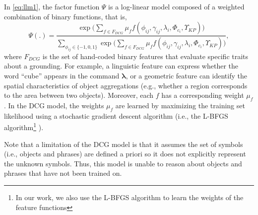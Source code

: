 In \eqref{eq:llm1}, the factor function $\Psi$ is a log-linear model composed of a weighted combination of binary functions, that is,
\begin{equation}
\Psi(.) = \frac {\exp \Big( \sum\limits_{f \in F_{DCG}} \mu_f f(\phi_{ij},\gamma_{ij},\lambda_i,\Phi_{c_{i}},\Upsilon_{KP}) \Big)}{\sum\limits_{\phi_{ij} \in \{-1,0,1\}}\exp \Big( \sum\limits_{f \in F_{DCG}} \mu_f f(\phi_{ij},\gamma_{ij},\lambda_i,\Phi_{c_{i}},\Upsilon_{KP}) \Big)},
\label{eq:llm2}
\end{equation}
where $F_{DCG}$ is the set of hand-coded binary features that evaluate specific traits about a grounding. For example, a linguistic feature can express whether the word ``cube'' appears in the command $\boldsymbol{\lambda}$, or a geometric feature can identify the spatial characteristics of object aggregations (e.g., whether a region corresponds to the area between two objects). Moreover, each $f$ has a corresponding weight $\mu_f$. In the DCG model, the weights $\mu_f$ are learned by maximizing the training set likelihood using a stochastic gradient descent algorithm (i.e., the L-BFGS algorithm\footnote{In our work, we also use the {L-BFGS} algorithm to learn the weights of the feature functions} \cite{liu1989}). 


Note that a limitation of the DCG model is that it assumes the set of symbols (i.e., objects and phrases) are defined a priori so it does not explicitly represent the unknown symbols. Thus, this model is unable to reason about objects and phrases that have not been trained on. 